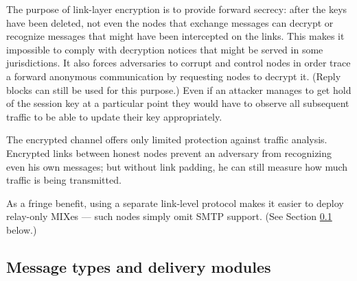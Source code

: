 \documentclass{llncs}
\begin{document}
%


%

The purpose of link-layer encryption is to provide forward secrecy: 
after the keys
have been deleted, not even the
nodes that exchange messages can decrypt or recognize messages
that might have been intercepted on the links. This makes it
impossible to comply with decryption notices that might be served in
some jurisdictions.  
It also forces adversaries to 
corrupt and control nodes in order trace
a forward anonymous communication by requesting nodes to decrypt
it. 
(Reply blocks can still be used for this purpose.)  Even if an
attacker manages to get hold of the session key at a particular point
they would have to observe all subsequent traffic to be able to update
their key appropriately.

The encrypted channel offers only limited protection against traffic
analysis. Encrypted links between honest nodes prevent an adversary
from recognizing even his own messages; but without link padding, he
can still measure how much traffic is being transmitted.

As a fringe benefit, using a separate link-level protocol makes it
easier to deploy relay-only MIXes --- such nodes simply omit SMTP
support.  (See Section \ref{subsec:delivery-modules} below.)

\subsection{Message types and delivery modules}
\label{subsec:delivery-modules}
\end{document}
